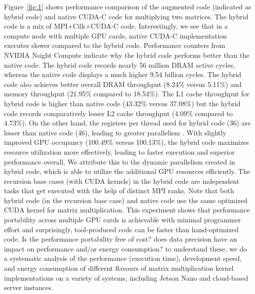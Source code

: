 Figure~\ref{fig:1} shows performance comparison of the augmented code 
 (indicated as hybrid code) and native CUDA-C code for multiplying two matrices. The hybrid code is a mix of MPI+Cilk+CUDA-C code. Interestingly, we see that in a compute node with multiple GPU cards, native CUDA-C implementation executes slower compared to the hybrid code. 
Performance counters from NVIDIA Nsight Compute indicate why the hybrid code performs better than the native code. The hybrid code records nearly 56 million DRAM active cycles, whereas the native code displays a much higher 9.54 billion cycles. The hybrid code also achieves better overall DRAM throughput (8.24\% versus 5.11\%) and memory throughput (21.95\% compared to 18.54\%). The  L1 cache throughput for hybrid code is higher than native code (43.32\% versus 37.08\%) but the hybrid code records comparatively lesser L2 cache throughput (4.09\% compared to 4.73\%). On the other hand, the registers per thread used for hybrid code (36) are lesser than native code (46), leading to greater parallelism . With slightly improved GPU occupancy (100.49\% versus 100.13\%), the hybrid code maximizes resource utilization more effectively, leading to faster execution and superior performance overall.
 We attribute this to the dynamic parallelism created in hybrid code, which is able to utilize the additional GPU resources efficiently. The recursion base cases (with CUDA kernels) in the hybrid code are independent tasks that get executed with the help of distinct MPI ranks. Note that both hybrid code (in the recursion base case) and native code use the same optimized CUDA kernel for matrix multiplication.
 This experiment shows that performance portability across multiple GPU cards is achievable with minimal programmer effort and surprisingly, tool-produced code can be faster than hand-optimized code. Is the performance portability free of cost? does data precision have an impact on performance and/or energy consumption? to understand these, we do a systematic analysis of the performance (execution time), development speed, and energy consumption of different flavours of matrix multiplication kernel implementations on a variety of systems, including Jetson Nano and cloud-based server instances. 
